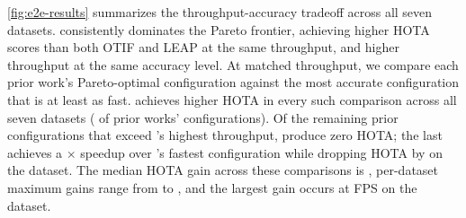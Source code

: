 \autoref{fig:e2e-results} summarizes the throughput-accuracy tradeoff across all seven datasets.
\sys{} consistently dominates the Pareto frontier,
achieving higher HOTA scores than both OTIF and LEAP at the same throughput,
and higher throughput at the same accuracy level.
At matched throughput,
we compare each prior work's Pareto-optimal configuration against the most accurate \sys{} configuration that is at least as fast.
\sys{} achieves higher HOTA in every such comparison across all seven datasets
(\compareMatchedTputReachableCount{} of \compareMatchedTputPriorConfigCount{} prior works' configurations).
Of the remaining \compareMatchedTputUnreachableCount{} prior configurations that exceed \sys{}'s highest throughput,
\compareMatchedTputUnreachableZeroHotaCount{} produce zero HOTA;
the last achieves a \compareMatchedTputUnreachableRestSpeedup{}$\times$ speedup over \sys{}'s fastest configuration
while dropping HOTA by \compareMatchedTputUnreachableRestHotaDrop{}
on the \compareMatchedTputUnreachableRestDataset{} dataset.
The median HOTA gain across these comparisons is \compareMatchedTputMedianHotaGain{},
per-dataset maximum gains range from \compareMatchedTputPerDatasetMaxGainMin{} to \compareMaxHotaImprovement{},
and the largest gain occurs at \compareMaxHotaImprovementFps{} FPS on the \compareMaxHotaImprovementDataset{} dataset.

